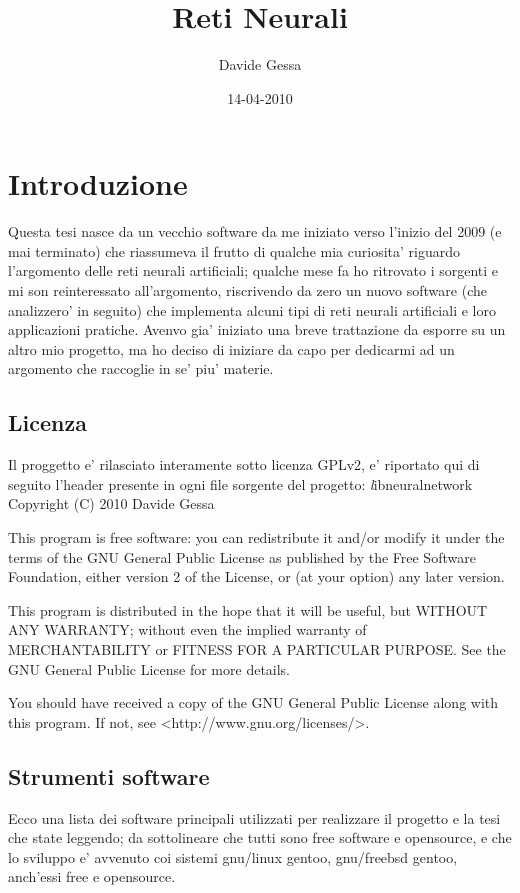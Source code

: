 \documentclass[a4paper,10pt]{book}
\title{Reti Neurali}
\author{Davide Gessa}
\date{14-04-2010}
\begin{document}
\maketitle

\tableofcontents
\setcounter{tocdepth}{4}
\listoffigures
\listoftables


\chapter{Introduzione}
Questa tesi nasce da un vecchio software da me iniziato verso l'inizio del 2009 (e
mai terminato) che riassumeva il frutto di qualche mia curiosita' riguardo 
l'argomento delle reti neurali artificiali; qualche mese fa ho ritrovato i sorgenti e mi son 
reinteressato all'argomento, riscrivendo da zero un nuovo software (che analizzero' 
in seguito) che implementa alcuni tipi di reti neurali artificiali e loro applicazioni
pratiche. Avenvo gia' iniziato una breve trattazione da esporre su un altro mio
progetto, ma ho deciso di iniziare da capo per dedicarmi ad un argomento che
raccoglie in se' piu' materie.

\section{Licenza}
Il proggetto e' rilasciato interamente sotto licenza GPLv2, e' riportato qui di 
seguito l'header presente in ogni file sorgente del progetto:
\newline
\newline 
\ttfamily
\textit
    libneuralnetwork
    Copyright (C) 2010 Davide Gessa
    
    This program is free software: you can redistribute it and/or modify
    it under the terms of the GNU General Public License as published by
    the Free Software Foundation, either version 2 of the License, or
    (at your option) any later version.

    This program is distributed in the hope that it will be useful,
    but WITHOUT ANY WARRANTY; without even the implied warranty of
    MERCHANTABILITY or FITNESS FOR A PARTICULAR PURPOSE.  See the
    GNU General Public License for more details.

    You should have received a copy of the GNU General Public License
    along with this program.  If not, see <http://www.gnu.org/licenses/>.
\rmfamily
\newline


\section{Strumenti software}
Ecco una lista dei software principali utilizzati per realizzare il progetto e la tesi
che state leggendo; da sottolineare che tutti sono free software e opensource, e che 
lo sviluppo e' avvenuto coi sistemi gnu/linux gentoo, gnu/freebsd gentoo, anch'essi free
e opensource.
\end{document}
